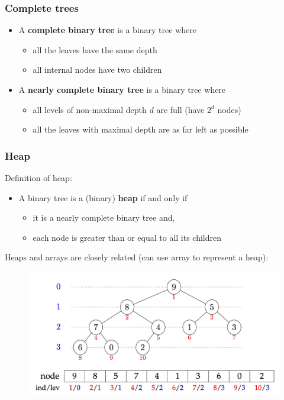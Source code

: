 \subsubsection{Complete trees}
\begin{itemize}
    \item A \textbf{complete binary tree} is a binary tree where
    \begin{itemize}
        \item all the leaves have the same depth
        \item all internal nodes have two children
    \end{itemize}
        \item A \textbf{nearly complete binary tree} is a binary tree where
        \begin{itemize}
            \item all levels of non-maximal depth $d$ are full (have $2^d$ nodes)
            \item all the leaves with maximal depth are as far left as possible
        \end{itemize}
\end{itemize}

\subsubsection{Heap}
Definition of heap:
\begin{itemize}
    \item A binary tree is a (binary) \textbf{heap} if and only if 
    \begin{itemize}
        \item it is a nearly complete binary tree and, 
        \item each node is greater than or equal to all its children
    \end{itemize}
\end{itemize}
Heaps and arrays are closely related (can use array to represent a heap): 
\begin{figure}[H]
    \centering
    \includegraphics[width=0.75\linewidth]{images/Screenshot 2024-05-30 at 15.11.16.jpg}
\end{figure}

